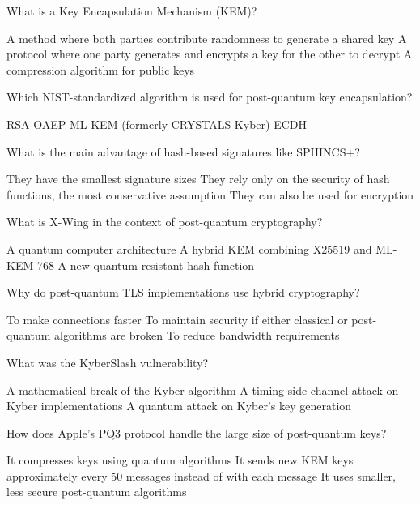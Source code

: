 \documentclass[10pt,a4paper,american]{exam}
\begin{document}
\begin{questions}
	\question What is a Key Encapsulation Mechanism (KEM)?
	\begin{randomizechoices}
		\choice A method where both parties contribute randomness to generate a shared key
		\CorrectChoice A protocol where one party generates and encrypts a key for the other to decrypt
		\choice A compression algorithm for public keys
	\end{randomizechoices}

	\question Which NIST-standardized algorithm is used for post-quantum key encapsulation?
	\begin{randomizechoices}
		\choice RSA-OAEP
		\CorrectChoice ML-KEM (formerly CRYSTALS-Kyber)
		\choice ECDH
	\end{randomizechoices}

	\question What is the main advantage of hash-based signatures like SPHINCS+?
	\begin{randomizechoices}
		\choice They have the smallest signature sizes
		\CorrectChoice They rely only on the security of hash functions, the most conservative assumption
		\choice They can also be used for encryption
	\end{randomizechoices}

	\question What is X-Wing in the context of post-quantum cryptography?
	\begin{randomizechoices}
		\choice A quantum computer architecture
		\CorrectChoice A hybrid KEM combining X25519 and ML-KEM-768
		\choice A new quantum-resistant hash function
	\end{randomizechoices}

	\question Why do post-quantum TLS implementations use hybrid cryptography?
	\begin{randomizechoices}
		\choice To make connections faster
		\CorrectChoice To maintain security if either classical or post-quantum algorithms are broken
		\choice To reduce bandwidth requirements
	\end{randomizechoices}

	\question What was the KyberSlash vulnerability?
	\begin{randomizechoices}
		\choice A mathematical break of the Kyber algorithm
		\CorrectChoice A timing side-channel attack on Kyber implementations
		\choice A quantum attack on Kyber's key generation
	\end{randomizechoices}

	\question How does Apple's PQ3 protocol handle the large size of post-quantum keys?
	\begin{randomizechoices}
		\choice It compresses keys using quantum algorithms
		\CorrectChoice It sends new KEM keys approximately every 50 messages instead of with each message
		\choice It uses smaller, less secure post-quantum algorithms
	\end{randomizechoices}


\end{questions}
\end{document}
